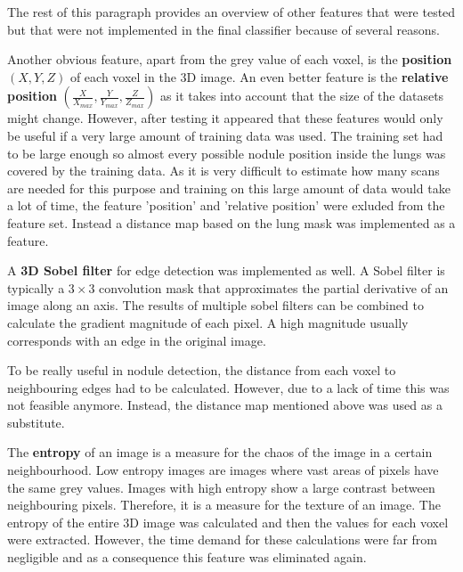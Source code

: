 The rest of this paragraph provides an overview of other features that were
tested but that were not implemented in the final classifier because of several
reasons.

Another obvious feature, apart from the grey value of each voxel, is the
\textbf{position} $(X, Y, Z)$ of each voxel in the 3D image. An even better
feature is the \textbf{relative position} $(\tfrac{X}{X_{max}}, \tfrac{Y}{Y_{max}}, \tfrac{Z}{Z_{max}})$ as
it takes into account that the size of the datasets might change. However, after
testing it appeared that these features would only be useful if a very large
amount of training data was used. The training set had to be large enough so
almost every possible nodule position inside the lungs was covered by the
training data. As it is very difficult to estimate how many scans are needed for
this purpose and training on this large amount of data would take a lot of time,
the feature 'position' and 'relative position' were exluded from the feature set.
Instead a distance map based on the lung mask was implemented as a feature.

A \textbf{3D Sobel filter} for edge detection was implemented as well. A Sobel
filter is typically a $3 \times 3$ convolution mask that approximates the
partial derivative of an image along an axis. The results of multiple sobel
filters can be combined to calculate the gradient magnitude of each pixel. A
high magnitude usually corresponds with an edge in the original image.

To be really useful in nodule detection, the distance from each voxel to
neighbouring edges had to be calculated. However, due to a lack of time this was
not feasible anymore. Instead, the distance map mentioned above was used as a
substitute.

The \textbf{entropy} of an image is a measure for the chaos of the image in a
certain neighbourhood. Low entropy images are images where vast areas of pixels
have the same grey values. Images with high entropy show a large contrast
between neighbouring pixels. Therefore, it is a measure for the texture of an
image. The entropy of the entire 3D image was calculated and then the values for
each voxel were extracted. However, the time demand for these calculations were
far from negligible and as a consequence this feature was eliminated again.

